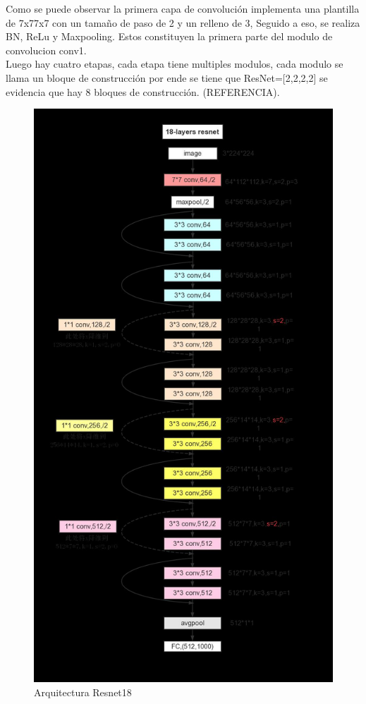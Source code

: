 				Como se puede observar la primera capa de convolución implementa una plantilla de 7x77x7 con un tamaño de paso de 2 y un relleno de 3, Seguido a eso, se realiza BN, ReLu y Maxpooling. Estos constituyen la primera parte del modulo de convolucion conv1.
				\\
				Luego hay cuatro etapas, cada etapa tiene multiples modulos, cada modulo se llama un bloque de construcción por ende se tiene que ResNet=[2,2,2,2] se evidencia que hay 8 bloques de construcción. (REFERENCIA).
\newpage				
				\begin{figure}[ht]
					\centering
					\includegraphics[scale=0.30]{Figs/69.png}
					\caption{Arquitectura Resnet18}
					\label{fig:RESNET18}
				\end{figure}
			
